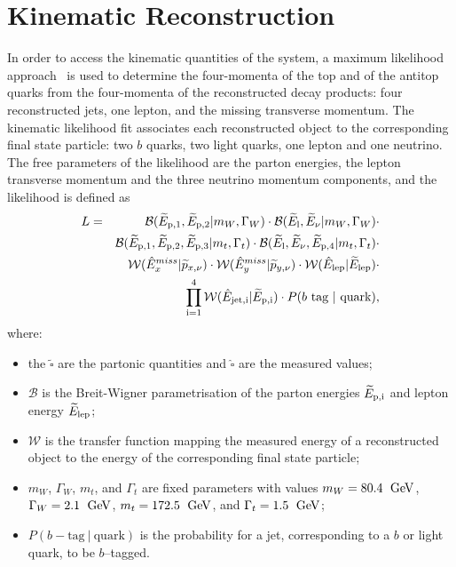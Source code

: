 \chapter{Kinematic Reconstruction}
\label{sec:reconstruction}

In order to access the kinematic quantities of the \ttbar{} system, a
maximum likelihood approach~\cite{klfitter} is used to determine the
four-momenta of the top and of the antitop quarks from the four-momenta of
the reconstructed decay products: four reconstructed jets, one lepton, and the
missing transverse momentum. The kinematic likelihood fit associates
each reconstructed object to the corresponding final state particle:
two $b$ quarks, two light quarks, one lepton and one neutrino.
The free parameters of the likelihood are the parton energies, the
lepton transverse momentum and the three neutrino momentum components,
and the likelihood is defined as
\begin{eqnarray}
L & = & \mathcal{B}(\widetilde{E}_{\rm{p,}1}, \widetilde{E}_{\rm{p,}2} | m_W,  \Gamma_W)
      \cdot \mathcal{B}(\widetilde{E}_{\rm l}, \widetilde{E}_{\nu} | m_W, \Gamma_W) \cdot \nonumber \\
           &   & \mathcal{B}(\widetilde{E}_{\rm{p,}1}, \widetilde{E}_{\rm{p,}2},     \widetilde{E}_{\rm{p,}3} | m_t, \Gamma_t)
                 \cdot \mathcal{B}(\widetilde{E}_{\rm l}, \widetilde{E}_{\nu},    \widetilde{E}_{\rm{p,}4} | m_t, \Gamma_t) \cdot \nonumber \\
           &   & \mathcal{W}( \hat{E}_{x}^{miss}| \widetilde{p}_{x, \nu})
                 \cdot \mathcal{W}(\hat{E}_{y}^{miss} |    \widetilde{p}_{y, \nu})
                 \cdot \mathcal{W}(\hat{E}_{\rm{lep}} | \widetilde{E}_{\rm{lep}}) \cdot \nonumber \\
           &   & \prod_{\rm{i=1}}^4 \mathcal{W}(\hat{E}_{\rm{jet,}i} | \widetilde{E}_{\rm{p,}i})
                 \cdot P(\textrm{$b$ tag} ~| ~\textrm{quark}),
\label{eq:klflikelihood}
\end{eqnarray}
where:
\begin{itemize}
\item the $\widetilde{\square{}}$ are the partonic quantities
       and $\hat{\square{}}$ are the measured values;
\item $\mathcal{B}$ is the Breit-Wigner parametrisation of the  parton
      energies $\widetilde{E}_{\rm{p,}i}$ and lepton energy
      $\widetilde{E}_{\rm{lep}}$;
\item $\mathcal{W}$ is the transfer function mapping the measured energy
      of a reconstructed object to the energy of the corresponding final state particle;
\item $m_W$, $\Gamma_W$, $m_t$, and $\Gamma_t$ are fixed parameters with values
       $m_W = 80.4~\; \mathrm{GeV}{}$, $\Gamma_W = 2.1~\; \mathrm{GeV}{}$, $m_t =
       172.5~\; \mathrm{GeV}{}$, and $\Gamma_t = 1.5~\; \mathrm{GeV}{}$; 
\item $P(b-\textrm{tag} ~| ~\textrm{quark})$ is the probability for a
  jet, corresponding to a $b$ or light quark, to be $b$--tagged.
\end{itemize}

